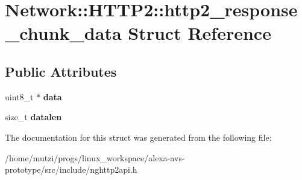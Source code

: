 \hypertarget{structNetwork_1_1HTTP2_1_1http2__response__chunk__data}{}\section{Network\+:\+:H\+T\+T\+P2\+:\+:http2\+\_\+response\+\_\+chunk\+\_\+data Struct Reference}
\label{structNetwork_1_1HTTP2_1_1http2__response__chunk__data}
\subsection*{Public Attributes}
\begin{DoxyCompactItemize}
\item 
\mbox{\label{structNetwork_1_1HTTP2_1_1http2__response__chunk__data_a42cc6c761c0f16a0b164007dcd6a5362}} 
uint8\+\_\+t $\ast$ {\bfseries data}
\item 
\mbox{\label{structNetwork_1_1HTTP2_1_1http2__response__chunk__data_a427697b6f58e3d8dd0072a81a148368f}} 
size\+\_\+t {\bfseries datalen}
\end{DoxyCompactItemize}


The documentation for this struct was generated from the following file\+:\begin{DoxyCompactItemize}
\item 
/home/mutzi/progs/linux\+\_\+workspace/alexa-\/avs-\/prototype/src/include/nghttp2api.\+h\end{DoxyCompactItemize}
